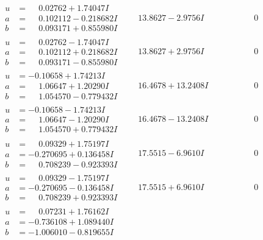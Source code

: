 \documentclass[1p]{elsarticle_modified}
\theoremstyle{definition}
\begin{document}
$$\begin{array}{c|c|c}
\begin{aligned}
u &= \phantom{-}0.02762 + 1.74047 I \\
a &= \phantom{-}0.102112 - 0.218682 I \\
b &= \phantom{-}0.093171 + 0.855980 I\end{aligned}
 & \phantom{-}13.8627 - 2.9756 I & \phantom{-0.000000 } 0 \\ \hline\begin{aligned}
u &= \phantom{-}0.02762 - 1.74047 I \\
a &= \phantom{-}0.102112 + 0.218682 I \\
b &= \phantom{-}0.093171 - 0.855980 I\end{aligned}
 & \phantom{-}13.8627 + 2.9756 I & \phantom{-0.000000 } 0 \\ \hline\begin{aligned}
u &= -0.10658 + 1.74213 I \\
a &= \phantom{-}1.06647 + 1.20290 I \\
b &= \phantom{-}1.054570 - 0.779432 I\end{aligned}
 & \phantom{-}16.4678 + 13.2408 I & \phantom{-0.000000 } 0 \\ \hline\begin{aligned}
u &= -0.10658 - 1.74213 I \\
a &= \phantom{-}1.06647 - 1.20290 I \\
b &= \phantom{-}1.054570 + 0.779432 I\end{aligned}
 & \phantom{-}16.4678 - 13.2408 I & \phantom{-0.000000 } 0 \\ \hline\begin{aligned}
u &= \phantom{-}0.09329 + 1.75197 I \\
a &= -0.270695 + 0.136458 I \\
b &= \phantom{-}0.708239 - 0.923393 I\end{aligned}
 & \phantom{-}17.5515 - 6.9610 I & \phantom{-0.000000 } 0 \\ \hline\begin{aligned}
u &= \phantom{-}0.09329 - 1.75197 I \\
a &= -0.270695 - 0.136458 I \\
b &= \phantom{-}0.708239 + 0.923393 I\end{aligned}
 & \phantom{-}17.5515 + 6.9610 I & \phantom{-0.000000 } 0 \\ \hline\begin{aligned}
u &= \phantom{-}0.07231 + 1.76162 I \\
a &= -0.736108 + 1.089440 I \\
b &= -1.006010 - 0.819655 I\end{aligned}

\end{array}$$
\end{document}
